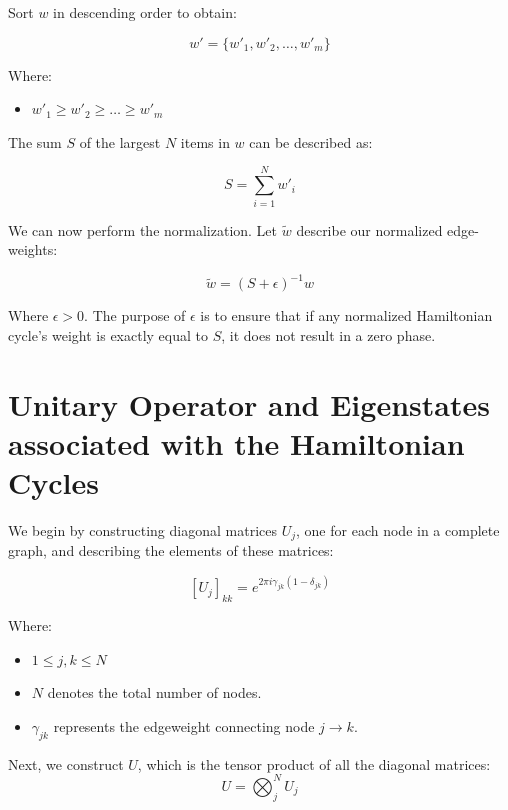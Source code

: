 \documentclass[msc,oneside]{ubcthesis}
\begin{document}
	Sort $w$ in descending order to obtain:
	
	\begin{equation}\label{sorted-weights}
	w' = \{w'_1, w'_2, \ldots, w'_m\}
	\end{equation}
	
	Where: \begin{itemize}
		\item[] $w'_1 \geq w'_2 \geq \ldots \geq w'_m$
		\end{itemize}
		
The sum $S$ of the largest $N$ items in $w$ can be described as:

\begin{equation}\label{sum-S}
S = \sum_{i=1}^{N} w'_i
\end{equation}

  We can now perform the normalization. Let $\tilde{w}$ describe our normalized edge-weights:
  
 \begin{equation}\label{normalization}
  	\tilde{w} = (S + \epsilon)^{-1}w
\end{equation}

		Where $\epsilon > 0$. The purpose of $\epsilon$ is to ensure that if any normalized Hamiltonian cycle's weight is exactly equal to $S$, it does not result in a zero phase.
	
	
	\section{Unitary Operator and Eigenstates associated with the Hamiltonian Cycles}
	
	We begin by constructing diagonal matrices $U_j$, one for each node in a complete graph, and describing the elements of these matrices:
	
	\begin{equation}\label{Uj-elements}
	\left[U_j \right]_{kk} = e^{2\pi i\gamma_{jk} (1 - \delta_{jk})}
	\end{equation}
	
	Where:	\begin{itemize}
		\item[]  $ 1 \leq j, k \leq N$
		\item[]  $N$ denotes the total number of nodes.
		\item[]  $\gamma_{jk}$ represents the edgeweight connecting node $j\rightarrow k$.
	\end{itemize}
	
	
	Next, we construct $U$, which is the tensor product of all the diagonal matrices:
	\begin{equation}\label{U-tensor}
	 U = \bigotimes_j^N U_j
	 \end{equation}
	
\end{document}
